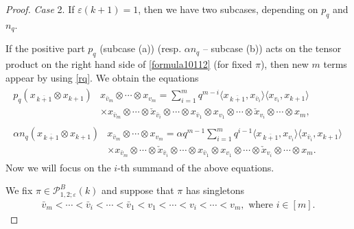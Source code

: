 \documentclass[pdftex]{sigma}
\numberwithin{equation}{section}
\def\ell {n}
\def\PB{\mathcal{P}^{B}}
\renewcommand{\epsilon}{\varepsilon}
\newcommand{\q}{q}
\newcommand{\s}{\alpha}%
\begin{document}
\begin{proof}
\smallskip\noindent
\emph{Case} 2. If $\epsilon(k+1)=1$, then we have two subcases, depending on $p_\q$ and $\ell_{\q}$.

If the positive part $p_\q $ (subcase (a)) (resp. $\s \ell_{\q}$ -- subcase (b)) acts on the tensor product on the right hand side of \eqref{formula10112} (for fixed $\pi$), then new $m$ terms appear by using \eqref{rq}. We obtain the equations
\begin{subequations}
\begin{align}
	\begin{split}
		p_\q(x_{\,\overline{k+1}}\otimes x_{k+1}) & x_{\bar v_m}\otimes \cdots \otimes x_{v_m}=
		\sum_{i=1}^m \q^{m-i}\langle x_{\,\overline{k+1}},x_{\bar v_i}\rangle \langle x_{v_i} ,x_{k+1}\rangle\, \\ &\times x_{\bar v_m }\otimes \cdots \otimes \check{x}_{\bar v_i} \otimes \cdots \otimes x_{\bar v_1} \otimes x_{v_1}\otimes \cdots \otimes \check{x}_{v_i} \otimes \cdots \otimes x_m,
	\end{split}\label{eq:equatinpomocdowodgolwny1}
	\\
	\begin{split}
		\alpha\ell_\q(x_{\,\overline{k+1}}\otimes x_{k+1}) & x_{\bar v_m}\otimes \cdots \otimes x_{v_m}=
		\alpha\q^{m-1}\sum_{i=1}^m \q^{i-1}
		\langle x_{\,\overline{k+1}},x_{ v_i}\rangle \langle x_{\bar v_i} ,x_{k+1}\rangle\, \\& \times x_{\bar v_m }\otimes \cdots \otimes \check{x}_{\bar v_i} \otimes \cdots \otimes x_{\bar v_1} \otimes x_{v_1}\otimes \cdots \otimes \check{x}_{v_i} \otimes \cdots \otimes x_m.
	\end{split}\label{eq:equatinpomocdowodgolwny2}
\end{align}
\end{subequations}
Now we will focus on the $i$-th summand of the above equations.

We fix $\pi\in \PB_{1,2;\epsilon}(k)$ and suppose that $\pi$ has singletons
\begin{align*}
\bar v_m<\cdots <\bar v_{ i} < \cdots <\bar v_1 < v_1<\cdots <v_i <\cdots <v_m,\text{ where } i\in [m].
\end{align*}


\end{proof}
\end{document}
